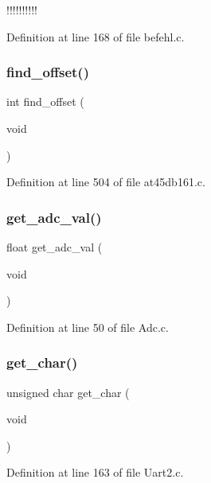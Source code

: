 !!!!!!!!!! 

Definition at line 168 of file befehl.\+c.

\mbox{\label{befehl_8c_ae31a6837673e8e8ee1012f92c4c77a58}} 
\subsubsection{find\+\_\+offset()}
{\footnotesize\ttfamily int find\+\_\+offset (\begin{DoxyParamCaption}\item[{void}]{ }\end{DoxyParamCaption})}



Definition at line 504 of file at45db161.\+c.

\mbox{\label{befehl_8c_ad7adec982039e6bbf58fd9ac980cbce1}} 
\subsubsection{get\+\_\+adc\+\_\+val()}
{\footnotesize\ttfamily float get\+\_\+adc\+\_\+val (\begin{DoxyParamCaption}\item[{void}]{ }\end{DoxyParamCaption})}



Definition at line 50 of file Adc.\+c.

\mbox{\label{befehl_8c_a70497f17f225906dcf46bd79898a615d}} 
\subsubsection{get\+\_\+char()}
{\footnotesize\ttfamily unsigned char get\+\_\+char (\begin{DoxyParamCaption}\item[{void}]{ }\end{DoxyParamCaption})}



Definition at line 163 of file Uart2.\+c.

\mbox{\label{befehl_8c_a10cc2d4ac3dbac1d56a6c84c5dc007b6}} 
